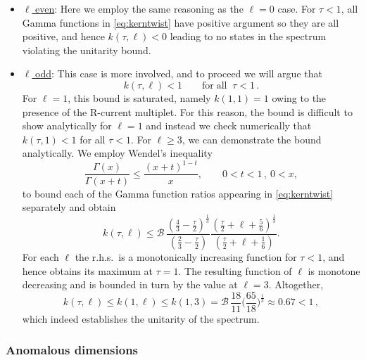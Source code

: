 \documentclass[11pt]{article}
\begin{document}
%
\begin{itemize}[wide,left=0pt]
\item \underline{$\ell$ even}: Here we employ the  same reasoning as the $\ell=0$ case. For $\tau < 1$, all Gamma functions in \eqref{eq:kerntwist} have positive argument so they are all positive, and hence $k(\tau,\ell) < 0$ leading to no states in the spectrum violating the unitarity bound.

\item 
\underline{$\ell$ odd}: This case is more involved,  and to proceed we will argue that  
%
\begin{equation}\label{eq:loddbound}
k(\tau,\ell) < 1 \qquad \mathrm{for\;all\;} \;  \tau < 1\,.
\end{equation}	
% 
For $\ell=1$, this bound is saturated, namely $k(1,1) = 1$ owing to the presence of the R-current multiplet. For this reason, the bound is difficult to show analytically for $\ell=1$ and instead we check numerically that $k(\tau,1) < 1$ for all $\tau < 1$. For $\ell \geq 3$, we can demonstrate the bound analytically. We employ Wendel's inequality
%
\begin{equation}\label{eq:Wendel}
\frac{\Gamma(x)}{\Gamma(x+t)} \leq \frac{(x+t)^{1-t}}{x}, \qquad 0 < t < 1\,,\ 0  < x,
\end{equation}	
%
to bound each of the Gamma function ratios appearing in \eqref{eq:kerntwist} separately and obtain
%
\begin{equation}
k(\tau,\ell) \leq 
	\mathcal{B}\, \frac{(\frac{4}{3}-\frac{\tau}{2})^{\frac{1}{3}}}{(\frac{2}{3}-\frac{\tau}{2})}
	\frac{(\frac{\tau}{2} + \ell+\frac{5}{6})^{\frac{1}{3}}}{(\frac{\tau}{2} + \ell+\frac{1}{6})}.
\end{equation}	
%
For each $\ell$ the r.h.s.\ is a monotonically increasing function for $\tau < 1$, and hence obtains its maximum at $\tau =1$. The resulting function of $\ell$ is monotone decreasing and is bounded in turn by the value at $\ell =3$. 
Altogether, 
%
\begin{equation}
k(\tau,\ell) \leq k(1,\ell) \leq k(1,3) = \mathcal{B}\, \frac{18}{11}\bigg(\frac{65}{18}\bigg)^{\frac{1}{3}} \approx 0.67 < 1\,,
\end{equation}	
%
which indeed establishes the unitarity of the spectrum.
\end{itemize}
%


\subsubsection{Anomalous dimensions}
\label{sec:anomdim}
\end{document}
